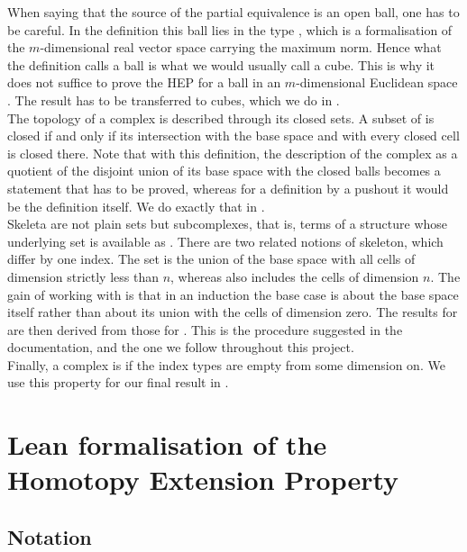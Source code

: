 \documentclass[11pt, a4paper, english]{article}
\theoremstyle{plain}
\theoremstyle{definition}
\theoremstyle{remark}
\numberwithin{equation}{section}
\numberwithin{theorem}{section}
\begin{document}
When saying that the source of the partial equivalence is an open ball, one has to be careful. In the definition this ball lies in the type , which is a formalisation of the $m$-dimensional real vector space carrying the maximum norm. Hence what the definition calls a ball is what we would usually call a cube. This is why it does not suffice to prove the HEP for a ball in an $m$-dimensional Euclidean space . The result has to be transferred to cubes, which we do in .\\
The topology of a complex is described through its closed sets. A subset of  is closed if and only if its intersection with the base space and with every closed cell is closed there. Note that with this definition, the description of the complex as a quotient of the disjoint union of its base space with the closed balls becomes a statement that has to be proved, whereas for a definition by a pushout it would be the definition itself. We do exactly that in . \\ %
Skeleta are not plain sets but subcomplexes, that is, terms of a structure whose underlying set is available as . There are two related notions of skeleton, which differ by one index. The set  is the union of the base space with all cells of dimension strictly less than $n$, whereas  also includes the cells of dimension $n$. The gain of working with  is that in an induction the base case is about the base space itself rather than about its union with the cells of dimension zero. The results for  are then derived from those for . This is the procedure suggested in the documentation, and the one we follow throughout this project. \\
Finally, a complex is  if the index types  are empty from some dimension on. We use this property for our final result in .

\clearpage 
\section {Lean formalisation of the Homotopy Extension Property} \label{section:formalisation}

\subsection{Notation} \label{subsec:lean:notation}
\end{document}
